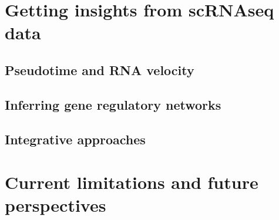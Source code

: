 \section{Getting insights from scRNAseq data}

\subsection{Pseudotime and RNA velocity}

\subsection{Inferring gene regulatory networks}

\subsection{Integrative approaches}

\section{Current limitations and future perspectives}

